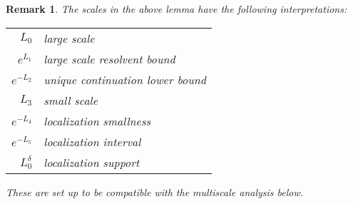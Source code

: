 \documentclass{amsart}
\newtheorem{remark}[equation]{Remark}
\numberwithin{equation}{section}
\numberwithin{figure}{section}
\begin{document}
\begin{remark}
The scales in the above lemma have the following interpretations:
\begin{center}
\begin{tabular}{rl}
$L_0$ & large scale \\
$e^{L_1}$ & large scale resolvent bound \\
$e^{-L_2}$ & unique continuation lower bound \\
$L_3$ & small scale \\
$e^{-L_4}$ & localization smallness \\
$e^{-L_5}$ & localization interval \\
$L_0^{\delta}$ & localization support \\
\end{tabular}
\end{center}
These are set up to be compatible with the multiscale analysis below.
\end{remark}
\end{document}
